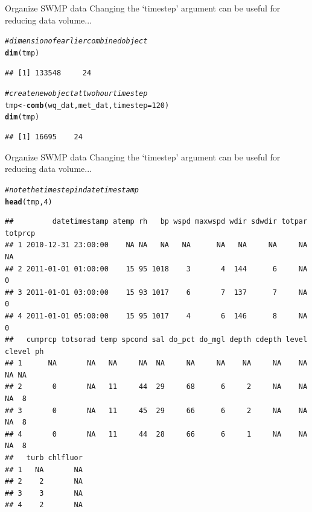 \documentclass[xcolor=svgnames]{beamer}\usepackage[]{graphicx}\usepackage[]{color}
\makeatletter
\newcommand{\hlnum}[1]{\textcolor[rgb]{0.686,0.059,0.569}{#1}}%
\newcommand{\hlcom}[1]{\textcolor[rgb]{0.678,0.584,0.686}{\textit{#1}}}%
\newcommand{\hlstd}[1]{\textcolor[rgb]{0.345,0.345,0.345}{#1}}%
\newcommand{\hlkwb}[1]{\textcolor[rgb]{0.69,0.353,0.396}{#1}}%
\newcommand{\hlkwc}[1]{\textcolor[rgb]{0.333,0.667,0.333}{#1}}%
\newcommand{\hlkwd}[1]{\textcolor[rgb]{0.737,0.353,0.396}{\textbf{#1}}}%
\newenvironment{kframe}{%
 \def\at@end@of@kframe{}%
 \ifinner\ifhmode%
  \def\at@end@of@kframe{\end{minipage}}%
  \begin{minipage}{\columnwidth}%
 \fi\fi%
 \def\FrameCommand##1{\hskip\@totalleftmargin \hskip-\fboxsep
 \colorbox{shadecolor}{##1}\hskip-\fboxsep
     \hskip-\linewidth \hskip-\@totalleftmargin \hskip\columnwidth}%
 \MakeFramed {\advance\hsize-\width
   \@totalleftmargin\z@ \linewidth\hsize
   \@setminipage}}%
 {\par\unskip\endMakeFramed%
 \at@end@of@kframe}
\newenvironment{knitrout}{}{} %
\makeatother
\begin{document}
\begin{frame}[containsverbatim]{Organize SWMP data}
Changing the `timestep' argument can be useful for reducing data volume...
\begin{knitrout}\scriptsize
{}\color{fgcolor}\begin{kframe}
\begin{alltt}
\hlcom{# dimension of earlier combined object}
\hlkwd{dim}\hlstd{(tmp)}
\end{alltt}
\begin{verbatim}
## [1] 133548     24
\end{verbatim}
\begin{alltt}
\hlcom{# create new object at two hour time step}
\hlstd{tmp} \hlkwb{<-} \hlkwd{comb}\hlstd{(wq_dat, met_dat,} \hlkwc{timestep} \hlstd{=} \hlnum{120}\hlstd{)}
\hlkwd{dim}\hlstd{(tmp)}
\end{alltt}
\begin{verbatim}
## [1] 16695    24
\end{verbatim}
\end{kframe}
\end{knitrout}
\end{frame}

\begin{frame}[containsverbatim]{Organize SWMP data}
Changing the `timestep' argument can be useful for reducing data volume...
\begin{knitrout}\scriptsize
{}\color{fgcolor}\begin{kframe}
\begin{alltt}
\hlcom{# note the time step in datetimestamp}
\hlkwd{head}\hlstd{(tmp,} \hlnum{4}\hlstd{)}
\end{alltt}
\begin{verbatim}
##         datetimestamp atemp rh   bp wspd maxwspd wdir sdwdir totpar totprcp
## 1 2010-12-31 23:00:00    NA NA   NA   NA      NA   NA     NA     NA      NA
## 2 2011-01-01 01:00:00    15 95 1018    3       4  144      6     NA       0
## 3 2011-01-01 03:00:00    15 93 1017    6       7  137      7     NA       0
## 4 2011-01-01 05:00:00    15 95 1017    4       6  146      8     NA       0
##   cumprcp totsorad temp spcond sal do_pct do_mgl depth cdepth level clevel ph
## 1      NA       NA   NA     NA  NA     NA     NA    NA     NA    NA     NA NA
## 2       0       NA   11     44  29     68      6     2     NA    NA     NA  8
## 3       0       NA   11     45  29     66      6     2     NA    NA     NA  8
## 4       0       NA   11     44  28     66      6     1     NA    NA     NA  8
##   turb chlfluor
## 1   NA       NA
## 2    2       NA
## 3    3       NA
## 4    2       NA
\end{verbatim}
\end{kframe}
\end{knitrout}
\end{frame}
\end{document}
